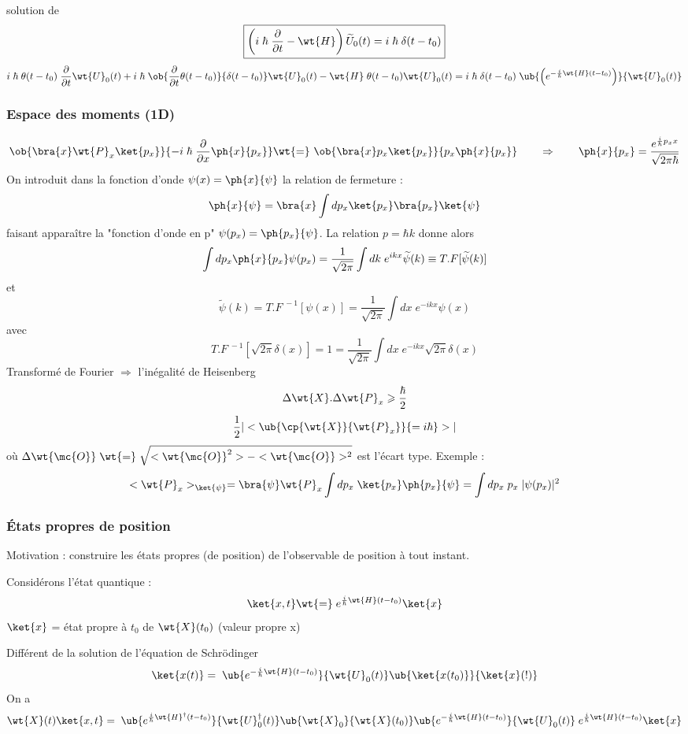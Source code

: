 solution de 
\[
\boxed{\left(i\;\hbar\;\frac{\partial}{\partial t}-\wt{H}\right)
\widetilde{U}_0(t) = i\;\hbar\;\delta(t-t_0)}
\]
\[
i\;\hbar\;\theta(t-t_0)\;\frac{\partial}{\partial t}\wt{U}_0(t)+i\;\hbar\;
\ob{\frac{\partial}{\partial t}\theta(t-t_0)}{\delta(t-t_0)}\wt{U}_0(t) - 
\wt{H}\;\theta(t-t_0)\wt{U}_0(t) = i\;\hbar\;\delta(t-t_0)\;
\ub{\left(e^{-\frac{i}{\hbar}\wt{H}(t-t_0)}\right)}{\wt{U}_0(t)}
\]
\subsubsection{Espace des moments (1D)} %

\[
\ob{\bra{x}\wt{P}_x\ket{p_x}}{-i\;\hbar\;\frac{\partial}{\partial x}\ph{x}{p_x}}
\wt{=}\ \ob{\bra{x}p_x\ket{p_x}}{p_x\ph{x}{p_x}}
\qquad \Rightarrow \qquad \ph{x}{p_x} =
\frac{e^{\frac{i}{\hbar}p_xx}}{\sqrt{2\pi\hbar}}
\]
On introduit dans la fonction d'onde $\psi(x)=\ph{x}{\psi}$ la relation de fermeture :
\[
\ph{x}{\psi} = \bra{x}\int dp_x\ket{p_x}\bra{p_x}\ket{\psi}
\]
faisant apparaître la "fonction d'onde en p" $\psi(p_x)=\ph{p_x}{\psi}$. La relation
$p=\hbar k$ donne alors
\[
\int dp_x\ph{x}{p_x}\psi(p_x) = \frac{1}{\sqrt{2\pi}}\int dk\;e^{ikx}\widetilde{\psi}(k)
\equiv T.F[\widetilde{\psi}(k)]
\]
et
\[
\widetilde{\psi}(k) = T.F^{\;-1}[\psi(x)] = 
\frac{1}{\sqrt{2\pi}}\int dx\;e^{-ikx}\psi(x)
\]
avec
\[
T.F^{\;-1}[\sqrt{2\pi}\delta(x)]=1=
\frac{1}{\sqrt{2\pi}}\int dx\;e^{-ikx}\sqrt{2\pi}\delta(x)
\]
Transformé de Fourier $\Rightarrow$ l'inégalité de Heisenberg
\[
\Delta\wt{X}.\Delta\wt{P}_x\geqslant\frac{\hbar}{2}
\]
\[
\frac{1}{2}|<\ub{\cp{\wt{X}}{\wt{P}_x}}{=i\hbar}>|
\]
où $\Delta\wt{\mc{O}}\;\wt{=}\;\sqrt{<\wt{\mc{O}}^2>-<\wt{\mc{O}}>^2}$ est l'écart type. Exemple :
\[
<\wt{P}_x>_{\ket{\psi}}=\bra{\psi}\wt{P}_x\int dp_x\;\ket{p_x}\ph{p_x}{\psi} =
\int dp_x\;p_x\;|\psi(p_x)|^2
\]
\subsubsection{États propres de position} %
Motivation : construire les états propres (de position) de l'observable de
position à tout instant.

Considérons l'état quantique :
\[
\ket{x,t}\wt{=}\;e^{\frac{i}{\hbar}\wt{H}(t-t_0)}\ket{x}
\]
$\ket{x}$ = état propre à $t_0$ de $\wt{X}(t_0)$ (valeur propre x)

Différent de la solution de l'équation de Schrödinger
\[
\ket{x(t)}=\;\ub{e^{-\frac{i}{\hbar}\wt{H}(t-t_0)}}{\wt{U}_0(t)}
\ub{\ket{x(t_0)}}{\ket{x}(!)}
\]
On a
\[
\wt{X}(t)\ket{x,t}=\;
\ub{e^{\frac{i}{\hbar}\wt{H}^\dagger(t-t_0)}}{\wt{U}_0^\dagger(t)}
\ub{\wt{X}_0}{\wt{X}(t_0)}
\ub{e^{-\frac{i}{\hbar}\wt{H}(t-t_0)}}{\wt{U}_0(t)}
\;e^{\frac{i}{\hbar}\wt{H}(t-t_0)}\ket{x}
\]





